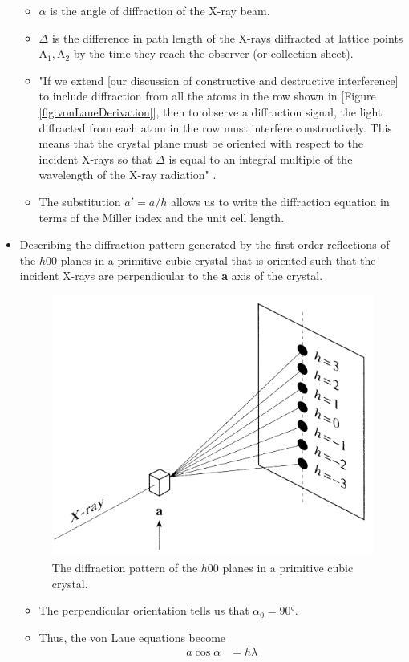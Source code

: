 \documentclass[../notes.tex]{subfiles}
\begin{document}
\begin{itemize}
\begin{itemize}
        \item $\alpha$ is the angle of diffraction of the X-ray beam.
        \item $\Delta$ is the difference in path length of the X-rays diffracted at lattice points $\text{A}_1,\text{A}_2$ by the time they reach the observer (or collection sheet).
        \item "If we extend [our discussion of constructive and destructive interference] to include diffraction from all the atoms in the row shown in [Figure \ref{fig:vonLaueDerivation}], then to observe a diffraction signal, the light diffracted from each atom in the row must interfere constructively. This means that the crystal plane must be oriented with respect to the incident X-rays so that $\Delta$ is equal to an integral multiple of the wavelength of the X-ray radiation" \parencite[1283]{bib:McQuarrieSimon}.
        \item The substitution $a'=a/h$ allows us to write the diffraction equation in terms of the Miller index and the unit cell length.
    \end{itemize}
    \item Describing the diffraction pattern generated by the first-order reflections of the $h00$ planes in a primitive cubic crystal that is oriented such that the incident X-rays are perpendicular to the \textbf{a} axis of the crystal.
    \begin{figure}[h!]
        \centering
        \includegraphics[width=0.4\linewidth]{../ExtFiles/primitiveDiff.png}
        \caption{The diffraction pattern of the $h00$ planes in a primitive cubic crystal.}
        \label{fig:primitiveDiff}
    \end{figure}
    \begin{itemize}
        \item The perpendicular orientation tells us that $\alpha_0=\ang{90}$.
        \item Thus, the von Laue equations become
        \begin{align*}
            a\cos\alpha &= h\lambda\\

\end{align*}
\end{itemize}
\end{itemize}
\end{document}
